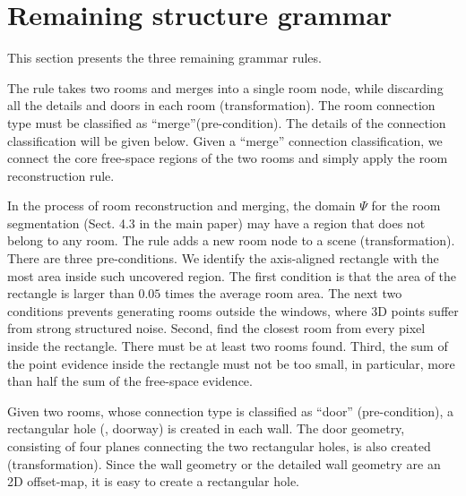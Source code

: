 \section{Remaining structure grammar}

This section presents the three remaining grammar rules.

 The rule takes two rooms and merges into
a single room node, while discarding all the details and doors in each
room (transformation). The room connection type must be
classified as ``merge''(pre-condition). The details of the connection
classification will be given below. Given a “merge” connection classification, we connect the core free-space regions of the two rooms and simply apply the room reconstruction rule. 

 In the process of room reconstruction
and merging, the domain $\Psi$ for the room segmentation (Sect. 4.3 in
the main paper) may have a region that does not belong to any room. The
rule adds a new room node to a scene
(transformation). 
%
There are three pre-conditions. We identify the axis-aligned rectangle
with the most area inside such uncovered region. The first condition is
that the area of the rectangle is larger than $0.05$ times the average
room area.  The next two conditions prevents generating rooms outside
the windows, where 3D points suffer from strong structured noise.
%
Second, find the closest room from every pixel inside the
rectangle. There must be at least two rooms found.
Third, the sum of the point evidence inside the rectangle must not be
too small, in particular, more than half the sum of the free-space
evidence.
%

 Given two rooms, whose connection type
is classified as ``door'' (pre-condition), a rectangular hole (\ie,
doorway) is created in each wall. The door geometry, consisting of four
planes connecting the two rectangular holes, is also created
(transformation). Since the wall geometry or the detailed wall geometry
are an 2D offset-map, it is easy to create a rectangular hole.


